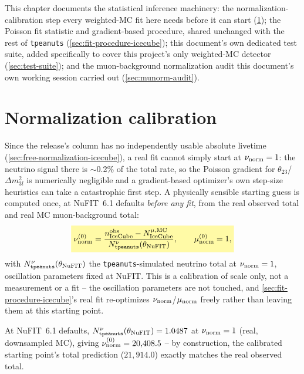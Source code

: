 \label{ch:inference-process}

This chapter documents the statistical inference machinery: the
normalization-calibration step every weighted-MC fit here needs before it
can start (\cref{sec:calibration}); the Poisson fit statistic and
gradient-based procedure, shared unchanged with the rest of
\texttt{tpeanuts} (\cref{sec:fit-procedure-icecube}); this document's own
dedicated test suite, added specifically to cover this project's only
weighted-MC detector (\cref{sec:test-suite}); and the muon-background
normalization audit this document's own working session carried out
(\cref{sec:munorm-audit}).

\section{Normalization calibration}
\label{sec:calibration}

\begin{theorybox}
Since the release's  column has no independently usable
absolute livetime (\cref{sec:free-normalization-icecube}), a real fit
cannot simply start at $\nu_{\rm norm}=1$: the neutrino signal there is
$\sim$0.2\% of the total rate, so the Poisson gradient for
$\theta_{23}$/$\Delta m^2_{3l}$ is numerically negligible and a
gradient-based optimizer's own step-size heuristics can take a
catastrophic first step. A physically sensible starting guess is computed
once, at NuFIT~6.1 defaults \emph{before any fit}, from the real observed
total and real MC muon-background total:
\begin{equation}
  \keyresult{\nu_{\rm norm}^{(0)} = \frac{n^{\rm obs}_{\rm IceCube} - N^{\mu,{\rm MC}}_{\rm IceCube}}
    {N^\nu_{\tt tpeanuts}(\theta_{\rm NuFIT})}, \qquad \mu_{\rm norm}^{(0)}=1,}
  \label{eq:calibration}
\end{equation}
with $N^\nu_{\tt tpeanuts}(\theta_{\rm NuFIT})$ the \texttt{tpeanuts}-simulated
neutrino total at $\nu_{\rm norm}=1$, oscillation parameters fixed at
NuFIT. This is a calibration of scale only, not a measurement or a fit --
the oscillation parameters are not touched, and \cref{sec:fit-procedure-icecube}'s
real fit re-optimizes $\nu_{\rm norm}$/$\mu_{\rm norm}$ freely rather than
leaving them at this starting point.
\end{theorybox}

\begin{resultbox}
At NuFIT~6.1 defaults, $N^\nu_{\tt tpeanuts}(\theta_{\rm NuFIT})=1.0487$ at
$\nu_{\rm norm}=1$ (real, downsampled MC), giving
$\nu_{\rm norm}^{(0)}=20{,}408.5$ -- by construction, the calibrated
starting point's total prediction ($21{,}914.0$) exactly matches the real
observed total.
\end{resultbox}

